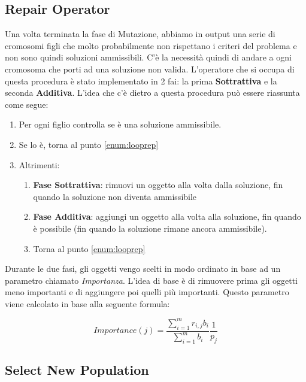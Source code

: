 \subsection{Repair Operator}

Una volta terminata la fase di Mutazione, abbiamo in output una serie di
cromosomi figli che molto probabilmente non rispettano i criteri del problema e
non sono quindi soluzioni ammissibili. C'è la necessità quindi di andare a
 ogni cromosoma che porti ad una soluzione non valida.
L'operatore che si occupa di questa procedura è stato implementato in 2 fai: la
prima \textbf{Sottrattiva} e la seconda \textbf{Additiva}. L'idea che c'è dietro
a questa procedura può essere riassunta come segue:

\begin{enumerate}
    \item Per ogni figlio controlla se è una soluzione ammissibile.
          \label{enum:looprep}
    \item Se lo è, torna al punto \ref{enum:looprep}
    \item Altrimenti:
          \begin{enumerate}
              \item \textbf{Fase Sottrattiva}: rimuovi un oggetto alla volta
                    dalla soluzione, fin quando la soluzione non diventa ammissibile
              \item \textbf{Fase Additiva}: aggiungi un oggetto alla volta alla
                    soluzione, fin quando è possibile (fin quando la soluzione
                    rimane ancora ammissibile).
              \item Torna al punto \ref{enum:looprep}
          \end{enumerate}
\end{enumerate}

Durante le due fasi, gli oggetti vengo scelti in modo ordinato in base ad un
parametro chiamato \textit{Importanza}. L'idea di base è di rimuovere prima gli
oggetti meno importanti e di aggiungere poi quelli più importanti. Questo parametro
viene calcolato in base alla seguente formula:

\begin{equation}
    Importance(j) = \frac{\sum_{i=1}^{m} r_{i,j} b_i}{\sum_{i=1}^{m} b_i} \frac{1}{p_j}
\end{equation}

\subsection{Select New Population}

